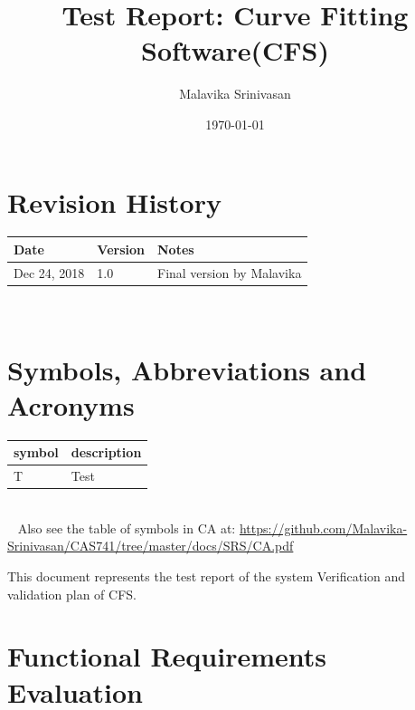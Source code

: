 \documentclass[12pt, titlepage]{article}
\newcommand{\famname}{CFS}
\begin{document}
\title{Test Report: Curve Fitting Software(CFS)} 
\author{Malavika Srinivasan}
\date{\today}
	
\maketitle


\section{Revision History}

\begin{tabularx}{\textwidth}{p{3cm}p{2cm}X}
\toprule {\bf Date} & {\bf Version} & {\bf Notes}\\
\midrule
Dec 24, 2018 & 1.0 & Final version by Malavika \\
\bottomrule
\end{tabularx}

~\newpage

\section{Symbols, Abbreviations and Acronyms}

\renewcommand{\arraystretch}{1.2}
\begin{tabular}{l l} 
  \toprule		
  \textbf{symbol} & \textbf{description}\\
  \midrule 
  T & Test\\
  \bottomrule
\end{tabular}\\
~\newline
Also see the table of symbols in CA at: 
\url{https://github.com/Malavika-Srinivasan/CAS741/tree/master/docs/SRS/CA.pdf}\\



\newpage

\tableofcontents

\listoftables %

\listoffigures %

\newpage


This document represents the test report of the system Verification and 
validation plan of \famname{}.

\section{Functional Requirements Evaluation}
\end{document}

